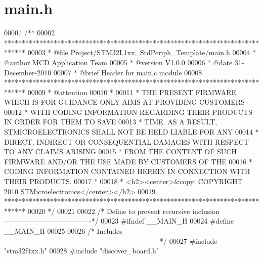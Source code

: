 \section{main.\+h}
\label{main_8h_source}

\begin{DoxyCode}
00001 \textcolor{comment}{/**}
00002 \textcolor{comment}{  ******************************************************************************}
00003 \textcolor{comment}{  * @file    Project/STM32L1xx\_StdPeriph\_Template/main.h }
00004 \textcolor{comment}{  * @author  MCD Application Team}
00005 \textcolor{comment}{  * @version V1.0.0}
00006 \textcolor{comment}{  * @date    31-December-2010}
00007 \textcolor{comment}{  * @brief   Header for main.c module}
00008 \textcolor{comment}{  ******************************************************************************}
00009 \textcolor{comment}{  * @attention}
00010 \textcolor{comment}{  *}
00011 \textcolor{comment}{  * THE PRESENT FIRMWARE WHICH IS FOR GUIDANCE ONLY AIMS AT PROVIDING CUSTOMERS}
00012 \textcolor{comment}{  * WITH CODING INFORMATION REGARDING THEIR PRODUCTS IN ORDER FOR THEM TO SAVE}
00013 \textcolor{comment}{  * TIME. AS A RESULT, STMICROELECTRONICS SHALL NOT BE HELD LIABLE FOR ANY}
00014 \textcolor{comment}{  * DIRECT, INDIRECT OR CONSEQUENTIAL DAMAGES WITH RESPECT TO ANY CLAIMS ARISING}
00015 \textcolor{comment}{  * FROM THE CONTENT OF SUCH FIRMWARE AND/OR THE USE MADE BY CUSTOMERS OF THE}
00016 \textcolor{comment}{  * CODING INFORMATION CONTAINED HEREIN IN CONNECTION WITH THEIR PRODUCTS.}
00017 \textcolor{comment}{  *}
00018 \textcolor{comment}{  * <h2><center>&copy; COPYRIGHT 2010 STMicroelectronics</center></h2>}
00019 \textcolor{comment}{  ******************************************************************************}
00020 \textcolor{comment}{  */}
00021 
00022 \textcolor{comment}{/* Define to prevent recursive inclusion -------------------------------------*/}
00023 \textcolor{preprocessor}{#}\textcolor{preprocessor}{ifndef} \textcolor{preprocessor}{\_\_MAIN\_H}
00024 \textcolor{preprocessor}{#}\textcolor{preprocessor}{define} \textcolor{preprocessor}{\_\_MAIN\_H}
00025 
00026 \textcolor{comment}{/* Includes ------------------------------------------------------------------*/}
00027 \textcolor{preprocessor}{#}\textcolor{preprocessor}{include} "stm32f4xx.h"
00028 \textcolor{preprocessor}{#}\textcolor{preprocessor}{include} "discover_board.h"

\end{DoxyCode}

